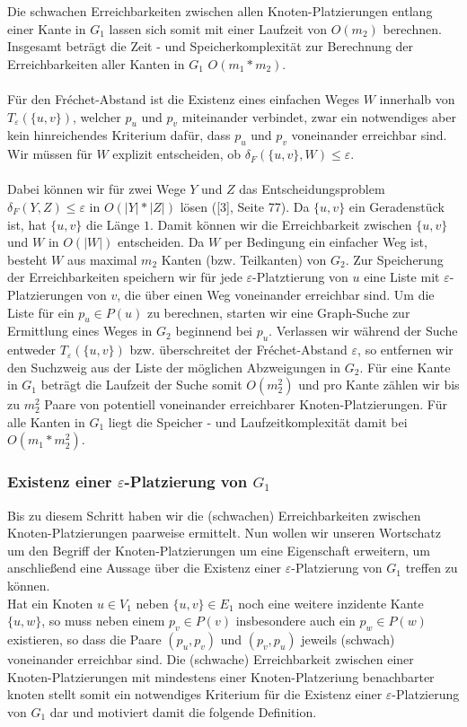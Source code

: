 \documentclass[a4paper, 12pt, twoside]{article}
\theoremstyle{Format1} %
\begin{document}
Die schwachen Erreichbarkeiten zwischen allen Knoten-Platzierungen entlang einer Kante in $G_1$ lassen sich somit mit einer Laufzeit von $O(m_2)$ berechnen.
Insgesamt beträgt die Zeit - und Speicherkomplexität zur Berechnung der Erreichbarkeiten aller Kanten in $G_1$ $O(m_1*m_2)$.
\\
\\
Für den Fréchet-Abstand ist die Existenz eines einfachen Weges $W$ innerhalb von $T_{\varepsilon}(\{u,v\})$, welcher $p_u$ und $p_v$ miteinander verbindet,
zwar ein notwendiges aber kein hinreichendes Kriterium dafür, dass $p_u$ und $p_v$ voneinander erreichbar sind. Wir müssen für $W$ explizit entscheiden,
ob $\delta_F(\{u,v\}, W) \leq \varepsilon$.
\\
\\
Dabei können wir für zwei Wege $Y$ und $Z$ das Entscheidungsproblem $\delta_F(Y,Z) \leq \varepsilon$ in $O(|Y|*|Z|)$ lösen ([3], Seite 77).
Da $\{u,v\}$ ein Geradenstück ist, hat $\{u,v\}$ die Länge $1$. Damit können wir die Erreichbarkeit zwischen $\{u,v\}$ und $W$ in $O(|W|)$ entscheiden.
Da $W$ per Bedingung ein einfacher Weg ist, besteht $W$ aus maximal $m_2$ Kanten (bzw. Teilkanten) von $G_2$.
Zur Speicherung der Erreichbarkeiten speichern wir für jede $\varepsilon$-Platztierung von $u$ eine Liste mit $\varepsilon$-Platzierungen von $v$, die
über einen Weg voneinander erreichbar sind. Um die Liste für ein $p_u \in P(u)$ zu berechnen, starten wir eine Graph-Suche zur Ermittlung eines
Weges in $G_2$ beginnend bei $p_u$. Verlassen wir während der Suche entweder $T_{\varepsilon}(\{u,v\})$ bzw. überschreitet der Fréchet-Abstand $\varepsilon$,
so entfernen wir den Suchzweig aus der Liste der möglichen Abzweigungen in $G_2$.
Für eine Kante in $G_1$ beträgt die Laufzeit der Suche somit $O(m_2^2)$ und pro Kante zählen wir bis zu $m_2^2$ Paare von potentiell voneinander erreichbarer Knoten-Platzierungen.
Für alle Kanten in $G_1$ liegt die Speicher - und Laufzeitkomplexität damit bei $O(m_1*m_2^2)$.

\subsubsection{Existenz einer $\varepsilon$-Platzierung von $G_1$}
Bis zu diesem Schritt haben wir die (schwachen) Erreichbarkeiten zwischen Knoten-Platzierungen paarweise ermittelt.
Nun wollen wir unseren Wortschatz um den Begriff der Knoten-Platzierungen um eine Eigenschaft erweitern, um anschließend eine Aussage über die Existenz
einer $\varepsilon$-Platzierung von $G_1$ treffen zu können.
\\
Hat ein Knoten $u \in V_1$ neben $\{u,v\} \in E_1$ noch eine weitere inzidente Kante $\{u,w\}$, so muss neben einem $p_v \in P(v)$ insbesondere auch
ein $p_w \in P(w)$ existieren, so dass die Paare $(p_u,p_v)$ und $(p_v,p_u)$ jeweils (schwach) voneinander erreichbar sind. Die (schwache) Erreichbarkeit
zwischen einer Knoten-Platzierungen mit mindestens einer Knoten-Platzeriung benachbarter knoten stellt somit ein notwendiges Kriterium für die Existenz
einer $\varepsilon$-Platzierung von $G_1$ dar und motiviert damit die folgende Definition.
\end{document}
